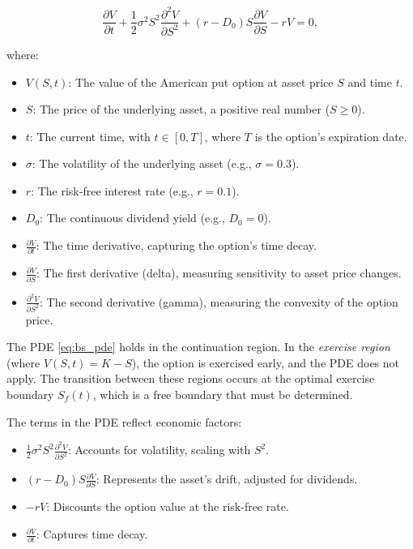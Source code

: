 \documentclass{article}
\begin{document}
\begin{equation}
\frac{\partial V}{\partial t} + \frac{1}{2} \sigma^2 S^2 \frac{\partial^2 V}{\partial S^2} + (r - D_0) S \frac{\partial V}{\partial S} - r V = 0,
\label{eq:bs_pde}
\end{equation}

where:
\begin{itemize}
    \item \( V(S, t) \): The value of the American put option at asset price \( S \) and time \( t \).
    \item \( S \): The price of the underlying asset, a positive real number (\( S \geq 0 \)).
    \item \( t \): The current time, with \( t \in [0, T] \), where \( T \) is the option's expiration date.
    \item \( \sigma \): The volatility of the underlying asset (e.g., \( \sigma = 0.3 \)).
    \item \( r \): The risk-free interest rate (e.g., \( r = 0.1 \)).
    \item \( D_0 \): The continuous dividend yield (e.g., \( D_0 = 0 \)).
    \item \( \frac{\partial V}{\partial t} \): The time derivative, capturing the option's time decay.
    \item \( \frac{\partial V}{\partial S} \): The first derivative (delta), measuring sensitivity to asset price changes.
    \item \( \frac{\partial^2 V}{\partial S^2} \): The second derivative (gamma), measuring the convexity of the option price.
\end{itemize}

The PDE \eqref{eq:bs_pde} holds in the continuation region. In the \emph{exercise region} (where \( V(S, t) = K - S \)), the option is exercised early, and the PDE does not apply. The transition between these regions occurs at the optimal exercise boundary \( S_f(t) \), which is a free boundary that must be determined.

The terms in the PDE reflect economic factors:
\begin{itemize}
    \item \( \frac{1}{2} \sigma^2 S^2 \frac{\partial^2 V}{\partial S^2} \): Accounts for volatility, scaling with \( S^2 \).
    \item \( (r - D_0) S \frac{\partial V}{\partial S} \): Represents the asset's drift, adjusted for dividends.
    \item \( -r V \): Discounts the option value at the risk-free rate.
    \item \( \frac{\partial V}{\partial t} \): Captures time decay.
\end{itemize}
\end{document}
